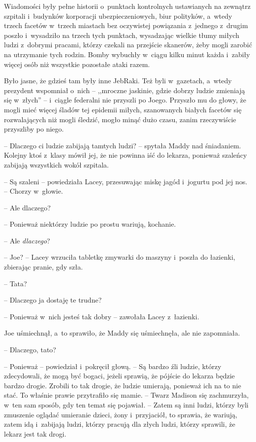 \documentclass[oneside,polish,11pt,sfheadings]{mwbk}
\begin{document}
Wiadomości były pełne historii o~punktach kontrolnych ustawianych na
zewnątrz szpitali i~budynków korporacji ubezpieczeniowych, biur
polityków, a~wtedy trzech facetów w~trzech miastach bez oczywistej
powiązania z~jednego z~drugim poszło i~wysadziło na trzech tych
punktach, wysadzając wielkie tłumy miłych ludzi z~dobrymi pracami,
którzy czekali na przejście skanerów, żeby mogli zarobić na utrzymanie
tych rodzin. Bomby wybuchły w~ciągu kilku minut każda i~zabiły więcej
osób niż wszystkie pozostałe ataki razem.

Było jasne, że gdzieś tam były inne JebRaki. Też byli w~gazetach, a~wtedy prezydent wspomniał o~nich -- ,,mroczne jaskinie, gdzie dobrzy
ludzie zmieniają się w~złych'' -- i~ciągle federalni nie przyszli po
Joego. Przyszło mu do głowy, że mogli mieć więcej śladów tej epidemii
miłych, szanowanych białych facetów się rozwalających niż mogli śledzić,
mogło minąć dużo czasu, zanim rzeczywiście przyszliby po niego.

-- Dlaczego ci ludzie zabijają tamtych ludzi? -- spytała Maddy nad
śniadaniem. Kolejny ktoś z~klasy mówił jej, że nie powinna iść do
lekarza, ponieważ szaleńcy zabijają wszystkich wokół szpitala.

-- Są szaleni -- powiedziała Lacey, przesuwając miskę jagód i~jogurtu pod
jej nos. -- Chorzy w~głowie.

-- Ale dlaczego?

-- Ponieważ niektórzy ludzie po prostu wariują, kochanie.

-- Ale \textit{dlaczego}?

-- Joe? -- Lacey wrzuciła tabletkę zmywarki do maszyny i~poszła do
łazienki, zbierając pranie, gdy szła.

-- Tata?

-- Dlaczego ja dostaję te trudne?

-- Ponieważ w~nich jesteś tak dobry -- zawołała Lacey z~łazienki.

Joe uśmiechnął, a~to sprawiło, że Maddy się uśmiechnęła, ale nie
zapomniała. 

-- Dlaczego, tato?

-- Ponieważ -- powiedział i~pokręcił głową. -- Są bardzo źli ludzie, którzy
zdecydowali, że mogą być bogaci, jeżeli sprawią, że pójście do lekarza
będzie bardzo drogie. Zrobili to tak drogie, że ludzie umierają,
ponieważ ich na to nie stać. To właśnie prawie przytrafiło się mamie. -- Twarz Madison się zachmurzyła, w~ten sam sposób, gdy ten temat się
pojawiał. -- Zatem są inni ludzi, którzy byli zmuszenie oglądać umieranie
dzieci, żony i~przyjaciół, to sprawia, że wariują, zatem idą i~zabijają
ludzi, którzy pracują dla złych ludzi, którzy sprawili, że lekarz jest
tak drogi.
\end{document}
